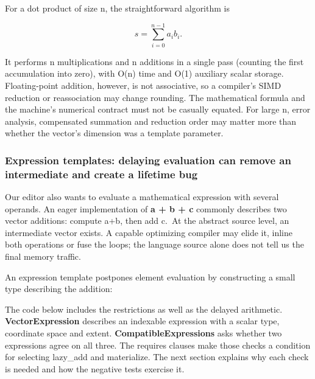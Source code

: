 For a dot product of size n, the straightforward algorithm is

\[
s=\sum_{i=0}^{n-1}a_i b_i.
\]

It performs n multiplications and n additions in a single pass (counting the first accumulation into zero), with O(n) time and O(1) auxiliary scalar storage. Floating-point addition, however, is not associative, so a compiler's SIMD reduction or reassociation may change rounding. The mathematical formula and the machine's numerical contract must not be casually equated. For large n, error analysis, compensated summation and reduction order may matter more than whether the vector's dimension was a template parameter.

\subsubsection{Expression templates: delaying evaluation can remove an intermediate and create a lifetime bug}\label{expression-templates-delaying-evaluation-can-remove-an-intermediate-and-create-a-lifetime-bug}

Our editor also wants to evaluate a mathematical expression with several operands. An eager implementation of \textbf{a + b + c} commonly describes two vector additions: compute a+b, then add c.~At the abstract source level, an intermediate vector exists. A capable optimizing compiler may elide it, inline both operations or fuse the loops; the language source alone does not tell us the final memory traffic.

An expression template postpones element evaluation by constructing a small type describing the addition:

The code below includes the restrictions as well as the delayed arithmetic. \textbf{VectorExpression} describes an indexable expression with a scalar type, coordinate space and extent. \textbf{CompatibleExpressions} asks whether two expressions agree on all three. The requires clauses make those checks a condition for selecting lazy\_add and materialize. The next section explains why each check is needed and how the negative tests exercise it.

